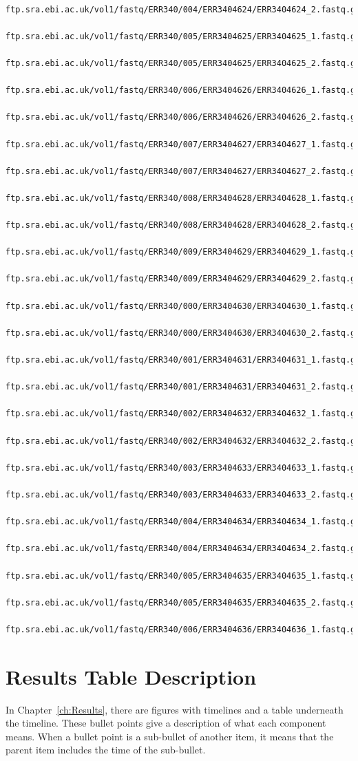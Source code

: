 \begin{footnotesize}
\begin{verbatim}
  ftp.sra.ebi.ac.uk/vol1/fastq/ERR340/004/ERR3404624/ERR3404624_2.fastq.gz
  ftp.sra.ebi.ac.uk/vol1/fastq/ERR340/005/ERR3404625/ERR3404625_1.fastq.gz
  ftp.sra.ebi.ac.uk/vol1/fastq/ERR340/005/ERR3404625/ERR3404625_2.fastq.gz
  ftp.sra.ebi.ac.uk/vol1/fastq/ERR340/006/ERR3404626/ERR3404626_1.fastq.gz
  ftp.sra.ebi.ac.uk/vol1/fastq/ERR340/006/ERR3404626/ERR3404626_2.fastq.gz
  ftp.sra.ebi.ac.uk/vol1/fastq/ERR340/007/ERR3404627/ERR3404627_1.fastq.gz
  ftp.sra.ebi.ac.uk/vol1/fastq/ERR340/007/ERR3404627/ERR3404627_2.fastq.gz
  ftp.sra.ebi.ac.uk/vol1/fastq/ERR340/008/ERR3404628/ERR3404628_1.fastq.gz
  ftp.sra.ebi.ac.uk/vol1/fastq/ERR340/008/ERR3404628/ERR3404628_2.fastq.gz
  ftp.sra.ebi.ac.uk/vol1/fastq/ERR340/009/ERR3404629/ERR3404629_1.fastq.gz
  ftp.sra.ebi.ac.uk/vol1/fastq/ERR340/009/ERR3404629/ERR3404629_2.fastq.gz
  ftp.sra.ebi.ac.uk/vol1/fastq/ERR340/000/ERR3404630/ERR3404630_1.fastq.gz
  ftp.sra.ebi.ac.uk/vol1/fastq/ERR340/000/ERR3404630/ERR3404630_2.fastq.gz
  ftp.sra.ebi.ac.uk/vol1/fastq/ERR340/001/ERR3404631/ERR3404631_1.fastq.gz
  ftp.sra.ebi.ac.uk/vol1/fastq/ERR340/001/ERR3404631/ERR3404631_2.fastq.gz
  ftp.sra.ebi.ac.uk/vol1/fastq/ERR340/002/ERR3404632/ERR3404632_1.fastq.gz
  ftp.sra.ebi.ac.uk/vol1/fastq/ERR340/002/ERR3404632/ERR3404632_2.fastq.gz
  ftp.sra.ebi.ac.uk/vol1/fastq/ERR340/003/ERR3404633/ERR3404633_1.fastq.gz
  ftp.sra.ebi.ac.uk/vol1/fastq/ERR340/003/ERR3404633/ERR3404633_2.fastq.gz
  ftp.sra.ebi.ac.uk/vol1/fastq/ERR340/004/ERR3404634/ERR3404634_1.fastq.gz
  ftp.sra.ebi.ac.uk/vol1/fastq/ERR340/004/ERR3404634/ERR3404634_2.fastq.gz
  ftp.sra.ebi.ac.uk/vol1/fastq/ERR340/005/ERR3404635/ERR3404635_1.fastq.gz
  ftp.sra.ebi.ac.uk/vol1/fastq/ERR340/005/ERR3404635/ERR3404635_2.fastq.gz
  ftp.sra.ebi.ac.uk/vol1/fastq/ERR340/006/ERR3404636/ERR3404636_1.fastq.gz
\end{verbatim}
\end{footnotesize}

\clearpage
\section{Results Table Description}

In Chapter~\ref{ch:Results}, there are figures with timelines and a table underneath the timeline.
These bullet points give a description of what each component means.
When a bullet point is a sub-bullet of another item, it means that the parent item includes the time of the sub-bullet.

